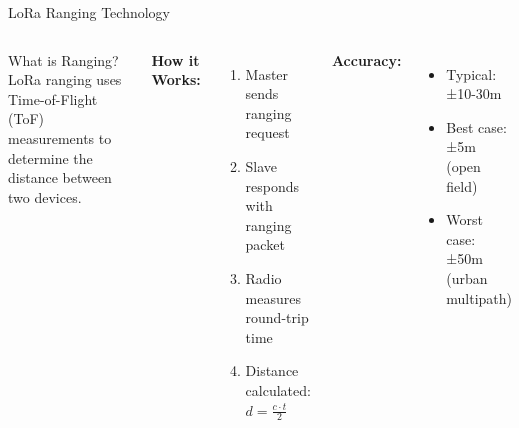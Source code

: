 \documentclass{beamer}
\begin{document}
\begin{frame}{LoRa Ranging Technology}
\begin{columns}
\begin{block}{What is Ranging?}
LoRa ranging uses Time-of-Flight (ToF) measurements to determine the distance between two devices.
\end{block}

\vspace{0.3cm}

\textbf{How it Works:}
\begin{enumerate}
    \item Master sends ranging request
    \item Slave responds with ranging packet
    \item Radio measures round-trip time
    \item Distance calculated: $d = \frac{c \cdot t}{2}$
\end{enumerate}

\vspace{0.3cm}

\textbf{Accuracy:}
\begin{itemize}
    \item Typical: ±10-30m
    \item Best case: ±5m (open field)
    \item Worst case: ±50m (urban multipath)
\end{itemize}

\end{columns}
\end{frame}
\end{document}
